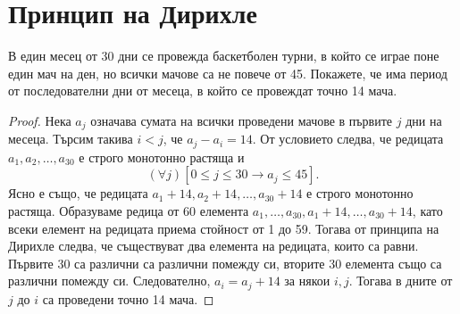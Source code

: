  



\section{Принцип на Дирихле}
\begin{problem}%
  В един месец от 30 дни се провежда баскетболен турни, в който се играе поне един мач на ден, но всички мачове са не повече от 45.
  Покажете, че има период от последователни дни от месеца, в който се провеждат точно 14 мача.
\end{problem}
\begin{proof}
  Нека $a_j$ означава сумата на всички проведени мачове в първите $j$ дни на месеца.
  Търсим такива $i<j$, че $a_j - a_i = 14$.
  От условието следва, че редицата $a_1,a_2,\dots, a_{30}$ е строго монотонно растяща и
  \[(\forall j)[0\leq j\leq 30 \rightarrow a_j \leq 45].\]
  Ясно е също, че редицата $a_1+14,a_2+14,\dots,a_{30}+14$ е строго монотонно растяща.
  Образуваме редица от 60 елемента $a_1,\dots,a_{30},a_1+14,\dots,a_{30}+14$, като 
  всеки елемент на редицата приема стойност от 1 до 59.
  Тогава от принципа на Дирихле следва, че съществуват два елемента на редицата, които са равни.
  Първите 30 са различни са различни помежду си, вторите 30 елемента също са различни помежду си.
  Следователно, $a_i = a_j + 14$ за някои $i,j$.
  Тогава в дните от $j$ до $i$ са проведени точно 14 мача.
\end{proof}

